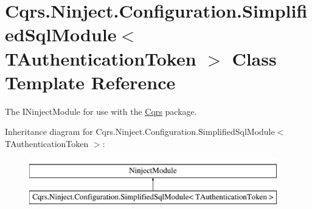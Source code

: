 \hypertarget{classCqrs_1_1Ninject_1_1Configuration_1_1SimplifiedSqlModule}{}\section{Cqrs.\+Ninject.\+Configuration.\+Simplified\+Sql\+Module$<$ T\+Authentication\+Token $>$ Class Template Reference}
\label{classCqrs_1_1Ninject_1_1Configuration_1_1SimplifiedSqlModule}


The I\+Ninject\+Module for use with the \hyperlink{namespaceCqrs}{Cqrs} package.  


Inheritance diagram for Cqrs.\+Ninject.\+Configuration.\+Simplified\+Sql\+Module$<$ T\+Authentication\+Token $>$\+:\begin{figure}[H]
\begin{center}
\leavevmode
\includegraphics[height=2.000000cm]{classCqrs_1_1Ninject_1_1Configuration_1_1SimplifiedSqlModule}
\end{center}
\end{figure}
